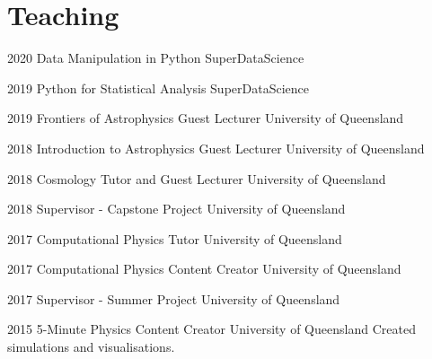 \section{Teaching}
\begin{entrylist}
	\entryInlineSmall
	{2020}
	{Data Manipulation in Python}
	{SuperDataScience}
	{}
\end{entrylist}
\begin{entrylist}
    \entryInlineSmall
    {2019}
    {Python for Statistical Analysis}
    {SuperDataScience}
    {}
\end{entrylist}
\begin{entrylist}
	\entryInlineSmall
	{2019}
	{Frontiers of Astrophysics Guest Lecturer}
	{University of Queensland}
	{}
\end{entrylist}
\begin{entrylist}
	\entryInlineSmall
	{2018}
	{Introduction to Astrophysics Guest Lecturer}
	{University of Queensland}
	{}
\end{entrylist}
\begin{entrylist}
	\entryInlineSmall
	{2018}
	{Cosmology Tutor and Guest Lecturer}
	{University of Queensland}
	{}
\end{entrylist}
\begin{entrylist}
	\entryInlineSmall
	{2018}
	{Supervisor - Capstone Project}
	{University of Queensland}
	{}
\end{entrylist}
\begin{entrylist}
	\entryInlineSmall
	{2017}
	{Computational Physics Tutor}
	{University of Queensland}
	{}
\end{entrylist}
\begin{entrylist}
	\entryInlineSmall
	{2017}
	{Computational Physics Content Creator}
	{University of Queensland}
	{}
\end{entrylist}
\begin{entrylist}
	\entryInlineSmall
	{2017}
	{Supervisor - Summer Project}
	{University of Queensland}
	{}
\end{entrylist}
\begin{entrylist}
	\entryInlineSmall
	{2015}
	{5-Minute Physics Content Creator}
	{University of Queensland}
	{Created simulations and visualisations.}
\end{entrylist}






